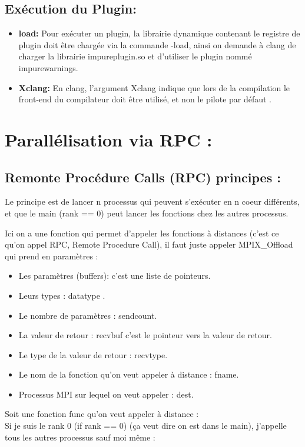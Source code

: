 \documentclass[12pt,titlepage]{article}
\begin{document}
\subsection{ Exécution du Plugin:}
\begin{itemize}
    \item \textbf{load:}
Pour exécuter un plugin, la librairie dynamique contenant le registre de plugin doit être chargée via la commande -load, ainsi on demande à clang de charger la librairie impureplugin.so et d'utiliser le plugin nommé  impurewarnings.
\item \textbf{ Xclang:}
En clang, l'argument Xclang indique que lors de la compilation le front-end du compilateur doit être utilisé, et non le pilote par défaut .
\end{itemize}


\section{Parallélisation via RPC : }
\subsection{Remonte Procédure Calls (RPC) principes :}
Le principe est de lancer n processus qui peuvent s'exécuter en n coeur différents, et que le main (rank == 0) peut lancer les fonctions chez les autres processus.

Ici on a une fonction qui permet d'appeler les fonctions à distances (c'est ce qu'on appel RPC, Remote Procedure Call), il faut juste appeler MPIX\_Offload qui prend en paramètres :
\begin{itemize}
\item Les paramètres (buffers): c'est une liste de pointeurs.
\item Leurs types : datatype .
\item Le nombre de paramètres : sendcount. 
\item La valeur de retour : recvbuf c'est le pointeur vers la valeur de retour.
\item Le type de la valeur de retour : recvtype.
\item Le nom de la fonction qu'on veut appeler à distance : fname.
\item Processus MPI sur lequel on veut appeler : dest.
	\end{itemize}

Soit une fonction func qu'on veut appeler à distance :\\
Si je suis le rank 0 (if rank == 0) (ça veut dire on est dans le main), j'appelle tous les autres processus sauf moi même : \\
\end{document}
